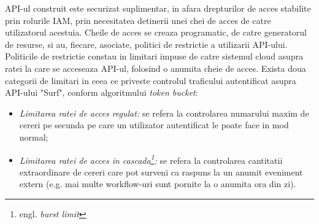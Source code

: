 API-ul construit este securizat suplimentar, in afara drepturilor de acces stabilite prin rolurile IAM, prin necesitatea detinerii unei chei de acces de catre utilizatorul acestuia. Cheile de acces se creaza programatic, de catre generatorul de resurse, si au, fiecare, asociate, politici de restrictie a utilizarii API-ului. Politicile de restrictie constau in limitari impuse de catre sistemul cloud asupra ratei la care se acceseaza API-ul, folosind o anumita cheie de acces. Exista doua categorii de limitari in ceea ce priveste controlul traficului autentificat asupra API-ului "Surf", conform algoritmului \textit{token bucket}:

\begin{itemize}
	\item{\textit{Limitarea ratei de acces regulat:} se refera la controlarea numarului maxim de cereri pe secunda pe care un utilizator autentificat le poate face in mod normal;}
	
	\item{\textit{Limitarea ratei de acces in cascada\footnote{engl. \textit{burst limit}}:} se refera la controlarea cantitatii extraordinare de cereri care pot surveni ca raspuns la un anumit eveniment extern (e.g. mai multe workflow-uri sunt pornite la o anumita ora din zi).}
	
\end{itemize}